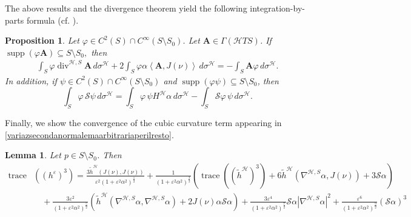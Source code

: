 \documentclass[11pt]{amsart}
\newcommand{\hhh}{{\mathcal{H}}}
\newcommand{\A}{\mathbf{A}}
\newcommand{\vh}{\nu}
\newcommand{\eps}{\varepsilon}
\newcommand{\s}{\mathcal S}
\DeclareMathOperator{\divv}{div}
\DeclareMathOperator{\trace}{trace}
\DeclareMathOperator{\supp}{supp}
\newtheorem{proposition}[theorem]{Proposition}
\newtheorem{lemma}[theorem]{Lemma}
\theoremstyle{definition}
\theoremstyle{remark}
\numberwithin{equation}{section}
\begin{document}
   The above results and the divergence theorem yield the following integration-by-parts formula (cf. \cite{MR2354992}).
    \begin{proposition}\label{proposizioneibpsubriemsurf}
        Let $\varphi\in C^2(S)\cap C^\infty(S\setminus S_0)$.  Let $\A\in\Gamma(\hhh TS)$. If $\supp \left(\varphi\A\right)\subseteq S\setminus S_0,$ then 
        \begin{align}\label{ibpsubriemequation}
            \int_S\varphi\divv^{\hhh,S}\A\,d\sigma^\hhh+2\int_S\varphi\alpha\left\langle \A,J(\vh)\right\rangle\,d\sigma^\hhh=-\int_S\A\varphi\,d\sigma^\hhh.
        \end{align}
        In addition, if $\psi\in C^2(S)\cap C^\infty(S\setminus S_0)$ and $\supp(\varphi\psi)\subseteq S \setminus S_0$, then 
        \begin{equation}\label{ibpverticalformula}
            \int_S\varphi\,\s\psi\,d\sigma^\hhh=\int_S\varphi\,\psi H^\hhh\alpha\,d\sigma^\hhh-\int_S\s\varphi\,\psi\,d\sigma^\hhh.
        \end{equation}
    \end{proposition}
Finally, we show the convergence of the cubic curvature term appearing in \eqref{variazsecondanormalemaarbitrariaperilresto}.
\begin{lemma}\label{lemmatracehepsterza}
    Let $p\in S\setminus S_0$. Then
    \begin{equation*}
        \begin{split}
            \trace&\left(\left(h^\eps\right)^3\right)=\frac{3\tilde h^\hhh(J(\vh),J(\vh))}{\eps^2\left(1+\eps^2\alpha^2\right)^\frac{1}{2}}+\frac{1}{\left(1+\eps^2\alpha^2\right)^\frac{3}{2}}\left(\trace\left(\left(\tilde h^\hhh\right)^3\right)+6\tilde h^\hhh\left(\nabla^{\hhh,S}\alpha,J(\vh)\right)+3\s\alpha\right)\\
            &\quad+\frac{3\eps^2}{\left(1+\eps^2\alpha^2\right)^\frac{5}{2}}\left(\tilde h^\hhh\left(\nabla^{\hhh,S}\alpha,\nabla^{\hhh,S}\alpha\right)+2J(\vh)\alpha\s\alpha\right)+\frac{3\eps^4}{\left(1+\eps^2\alpha^2\right)^\frac{7}{2}}\s\alpha\left|\nabla^{\hhh,S}\alpha\right|^2+\frac{\eps^6}{\left(1+\eps^2\alpha^2\right)^\frac{9}{2}}\left(\s\alpha\right)^3
        \end{split}
    \end{equation*}
\end{lemma}
\end{document}
